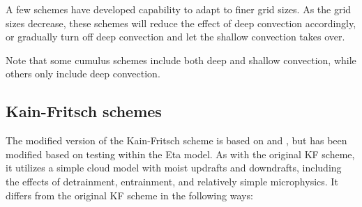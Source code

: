A few schemes have developed capability to adapt to finer grid sizes. As the grid sizes
decrease, these schemes will reduce the effect of deep convection accordingly, or gradually turn
off deep convection and let the shallow convection takes over.

Note that some cumulus schemes include both deep and shallow
convection, while others only include deep convection.
  
\subsection{Kain-Fritsch schemes}

The modified version of the Kain-Fritsch scheme \citep{kain04} is based on 
\citet{kain90} and \citet{kain93}, but has been modified based on 
testing within the Eta model. As with the original KF scheme, 
it utilizes a simple cloud model with moist updrafts and downdrafts, 
including the effects of detrainment, entrainment, and relatively 
simple microphysics. It differs from the original KF scheme in the following ways:

